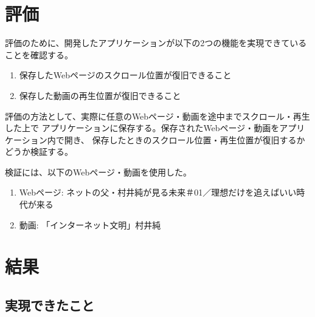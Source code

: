 \documentclass[a4j,10pt]{jsarticle}
\begin{document}
\section{評価}
評価のために、開発したアプリケーションが以下の2つの機能を実現できていることを確認する。
\begin{enumerate}
\item 保存したWebページのスクロール位置が復旧できること
\item 保存した動画の再生位置が復旧できること
\end{enumerate}
評価の方法として、実際に任意のWebページ・動画を途中までスクロール・再生した上で
アプリケーションに保存する。保存されたWebページ・動画をアプリケーション内で開き、
保存したときのスクロール位置・再生位置が復旧するかどうか検証する。

検証には、以下のWebページ・動画を使用した。
\begin{enumerate}
\item Webページ: ネットの父・村井純が見る未来＃01／理想だけを追えばいい時代が来る\cite{murai-web-page}
\item 動画: 「インターネット文明」村井純\cite{murai-video}
\end{enumerate}

\section{結果}
\subsection{実現できたこと}
\end{document}
